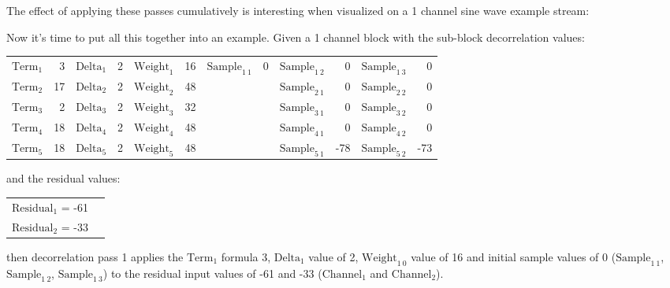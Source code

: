 The effect of applying these passes cumulatively is interesting when
visualized on a 1 channel sine wave example stream:

\begin{figure}[h]
\end{figure}

\clearpage

Now it's time to put all this together into an example.
Given a 1 channel block with the sub-block decorrelation values:
\begin{table}[h]
\begin{tabular}{r r|r r|r r||r r | r r | r r}
$\text{Term}_1$ & 3 & $\text{Delta}_1$ & 2 &
$\text{Weight}_1$ & 16 &
$\text{Sample}_{1~1}$ & 0 &
$\text{Sample}_{1~2}$ & 0 &
$\text{Sample}_{1~3}$ & 0 \\
$\text{Term}_2$ & 17 & $\text{Delta}_2$ & 2 &
$\text{Weight}_2$ & 48 &
& & $\text{Sample}_{2~1}$ & 0 &
$\text{Sample}_{2~2}$ & 0 \\
$\text{Term}_3$ & 2 & $\text{Delta}_3$ & 2 &
$\text{Weight}_3$ & 32 &
& & $\text{Sample}_{3~1}$ & 0 &
$\text{Sample}_{3~2}$ & 0 \\
$\text{Term}_4$ & 18 & $\text{Delta}_4$ & 2 &
$\text{Weight}_4$ & 48 &
& & $\text{Sample}_{4~1}$ & 0 &
$\text{Sample}_{4~2}$ & 0 \\
$\text{Term}_5$ & 18 & $\text{Delta}_5$ & 2 &
$\text{Weight}_5$ & 48 &
& & $\text{Sample}_{5~1}$ & -78 &
$\text{Sample}_{5~2}$ & -73 \\
\end{tabular}
\end{table}
\par
\noindent
and the residual values:
\begin{table}[h]
\begin{tabular}{r r}
$\text{Residual}_1$ = -61 \\
$\text{Residual}_2$ = -33 \\
\end{tabular}
\end{table}
\par
\noindent
then decorrelation pass 1 applies the $\text{Term}_1$
formula 3, $\text{Delta}_1$ value of 2,
$\text{Weight}_{1~0}$ value of 16 and initial sample values
of 0 ($\text{Sample}_{1~1}$, $\text{Sample}_{1~2}$,
$\text{Sample}_{1~3}$) to the residual input values of -61 and -33
($\text{Channel}_1$ and $\text{Channel}_2$).

